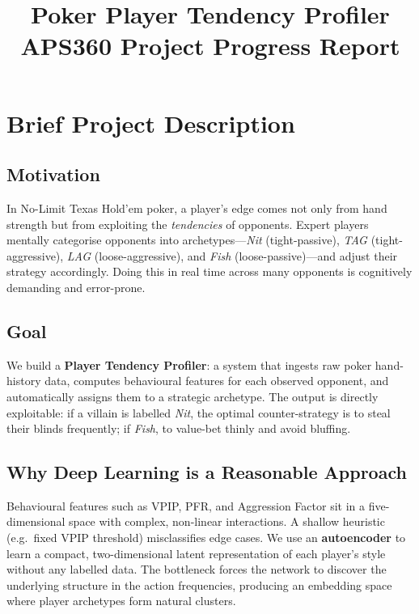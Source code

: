 \documentclass{article}
\title{\textbf{Poker Player Tendency Profiler}\\
\large APS360 Project Progress Report}
\author{%
}
\date{}
\begin{document}
\maketitle

\section{Brief Project Description}

\subsection{Motivation}
In No-Limit Texas Hold'em poker, a player's edge comes not only from hand strength but from
exploiting the \emph{tendencies} of opponents. Expert players mentally categorise opponents
into archetypes---\textit{Nit} (tight-passive), \textit{TAG} (tight-aggressive),
\textit{LAG} (loose-aggressive), and \textit{Fish} (loose-passive)---and adjust their
strategy accordingly. Doing this in real time across many opponents is cognitively demanding
and error-prone.

\subsection{Goal}
We build a \textbf{Player Tendency Profiler}: a system that ingests raw poker hand-history
data, computes behavioural features for each observed opponent, and automatically assigns
them to a strategic archetype. The output is directly exploitable: if a villain is labelled
\textit{Nit}, the optimal counter-strategy is to steal their blinds frequently; if
\textit{Fish}, to value-bet thinly and avoid bluffing.

\subsection{Why Deep Learning is a Reasonable Approach}
Behavioural features such as VPIP, PFR, and Aggression Factor sit in a five-dimensional
space with complex, non-linear interactions. A shallow heuristic (e.g.\ fixed VPIP
threshold) misclassifies edge cases. We use an \textbf{autoencoder} to learn a compact,
two-dimensional latent representation of each player's style without any labelled data.
The bottleneck forces the network to discover the underlying structure in the action
frequencies, producing an embedding space where player archetypes form natural clusters.
\end{document}
